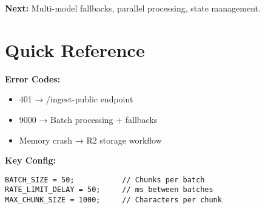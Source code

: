 \documentclass[11pt,a4paper]{article}
\begin{document}
\textbf{Next:} Multi-model fallbacks, parallel processing, state management.

\section{Quick Reference}

\textbf{Error Codes:}
\begin{itemize}
    \item 401 → /ingest-public endpoint
    \item 9000 → Batch processing + fallbacks
    \item Memory crash → R2 storage workflow
\end{itemize}

\textbf{Key Config:}
\begin{lstlisting}
BATCH_SIZE = 50;           // Chunks per batch
RATE_LIMIT_DELAY = 50;     // ms between batches  
MAX_CHUNK_SIZE = 1000;     // Characters per chunk
\end{lstlisting}
\end{document}
